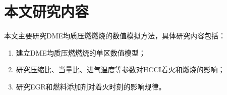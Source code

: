 \section{本文研究内容}

本文主要研究DME均质压燃燃烧的数值模拟方法，具体研究内容包括：

\begin{enumerate}
	\item 建立DME均质压燃燃烧的单区数值模型；
	\item 研究压缩比、当量比、进气温度等参数对HCCI着火和燃烧的影响；
	\item 研究EGR和燃料添加剂对着火时刻的影响规律。
\end{enumerate}
